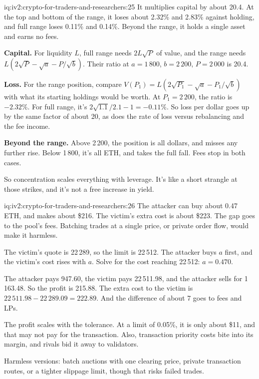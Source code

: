 \begin{solution}{iq:iv2:crypto-for-traders-and-researchers:25}
It multiplies capital by about 20.4. At the top and bottom of the range, it loses about 2.32\% and 2.83\% against holding, and full range loses 0.11\% and 0.14\%. Beyond the range, it holds a single asset and earns no fees.

\textbf{Capital.} For liquidity $L$, full range needs $2L\sqrt{P}$ of value, and the range needs $L(2\sqrt{P} - \sqrt{a} - P/\sqrt{b})$. Their ratio at $a = 1\,800$, $b = 2\,200$, $P = 2\,000$ is 20.4.

\textbf{Loss.} For the range position, compare $V(P_1) = L(2\sqrt{P_1} - \sqrt{a} - P_1/\sqrt{b})$ with what its starting holdings would be worth. At $P_1 = 2\,200$, the ratio is $-2.32\%$. For full range, it's $2\sqrt{1.1}/2.1 - 1 = -0.11\%$. So loss per dollar goes up by the same factor of about 20, as does the rate of loss versus rebalancing and the fee income.

\textbf{Beyond the range.} Above 2\,200, the position is all dollars, and misses any further rise. Below 1\,800, it's all ETH, and takes the full fall. Fees stop in both cases.

So concentration scales everything with leverage. It's like a short strangle at those strikes, and it's not a free increase in yield.

\end{solution}

\begin{solution}{iq:iv2:crypto-for-traders-and-researchers:26}
The attacker can buy about 0.47 ETH, and makes about \$216. The victim's extra cost is about \$223. The gap goes to the pool's fees. Batching trades at a single price, or private order flow, would make it harmless.

The victim's quote is 22\,289, so the limit is 22\,512. The attacker buys $a$ first, and the victim's cost rises with $a$. Solve for the cost reaching 22\,512: $a = 0.470$.

The attacker pays 947.60, the victim pays 22\,511.98, and the attacker sells for 1\,163.48. So the profit is 215.88. The extra cost to the victim is $22\,511.98 - 22\,289.09 = 222.89$. And the difference of about 7 goes to fees and LPs.

The profit scales with the tolerance. At a limit of 0.05\%, it is only about \$11, and that may not pay for the transaction. Also, transaction priority costs bite into its margin, and rivals bid it away to validators.

Harmless versions: batch auctions with one clearing price, private transaction routes, or a tighter slippage limit, though that risks failed trades.

\end{solution}

